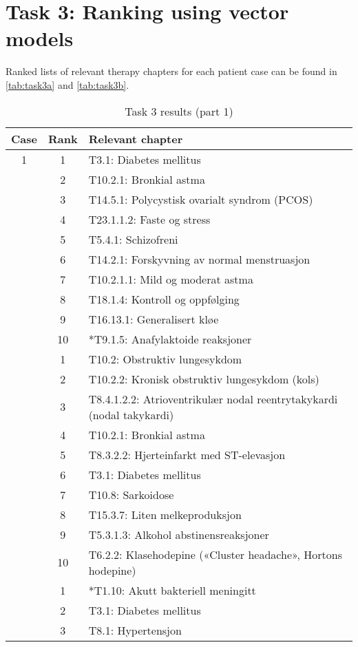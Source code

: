 \section{Task 3: Ranking using vector models}
Ranked lists of relevant therapy chapters for each patient case can be found
in \autoref{tab:task3a} and \autoref{tab:task3b}.
\begin{table}[htbp] \footnotesize \center
\caption{Task 3 results (part 1)\label{tab:task3a}}
\begin{tabular}{c c l}
    \toprule
    Case & Rank & Relevant chapter \\
    \midrule
	1 & 1 & T3.1: Diabetes mellitus \\
	 & 2 & T10.2.1: Bronkial astma \\
	 & 3 & T14.5.1: Polycystisk ovarialt syndrom (PCOS) \\
	 & 4 & T23.1.1.2: Faste og stress \\
	 & 5 & T5.4.1: Schizofreni \\
	 & 6 & T14.2.1: Forskyvning av normal menstruasjon \\
	 & 7 & T10.2.1.1: Mild og moderat astma \\
	 & 8 & T18.1.4: Kontroll og oppfølging \\
	 & 9 & T16.13.1: Generalisert kløe \\
	 & 10 & *T9.1.5: Anafylaktoide reaksjoner \\
	\addlinespace
	2 & 1 & T10.2: Obstruktiv lungesykdom \\
	 & 2 & T10.2.2: Kronisk obstruktiv lungesykdom (kols) \\
	 & 3 & T8.4.1.2.2: Atrioventrikulær nodal reentrytakykardi (nodal takykardi) \\
	 & 4 & T10.2.1: Bronkial astma \\
	 & 5 & T8.3.2.2: Hjerteinfarkt med ST-elevasjon \\
	 & 6 & T3.1: Diabetes mellitus \\
	 & 7 & T10.8: Sarkoidose \\
	 & 8 & T15.3.7: Liten melkeproduksjon \\
	 & 9 & T5.3.1.3: Alkohol abstinensreaksjoner \\
	 & 10 & T6.2.2: Klasehodepine («Cluster headache», Hortons hodepine) \\
	\addlinespace
	3 & 1 & *T1.10: Akutt bakteriell meningitt \\
	 & 2 & T3.1: Diabetes mellitus \\
	 & 3 & T8.1: Hypertensjon \\

\end{tabular}
\end{table}
